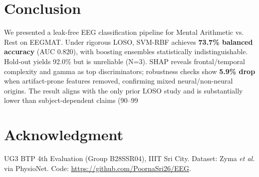 \documentclass[conference]{IEEEtran}
\begin{document}
\section{Conclusion}
We presented a leak-free EEG classification pipeline for Mental Arithmetic vs. Rest on EEGMAT. Under rigorous LOSO, SVM-RBF achieves \textbf{73.7\% balanced accuracy} (AUC 0.820), with boosting ensembles statistically indistinguishable. Hold-out yields 92.0\% but is unreliable (N=3). SHAP reveals frontal/temporal complexity and gamma as top discriminators; robustness checks show \textbf{5.9\% drop} when artifact-prone features removed, confirming mixed neural/non-neural origins. The result aligns with the only prior LOSO study and is substantially lower than subject-dependent claims (90–99%

\section*{Acknowledgment}
UG3 BTP 4th Evaluation (Group B28SSR04), IIIT Sri City. Dataset: Zyma \textit{et al.} via PhysioNet. Code: \url{https://github.com/PoornaSri26/EEG}.



\end{document}
